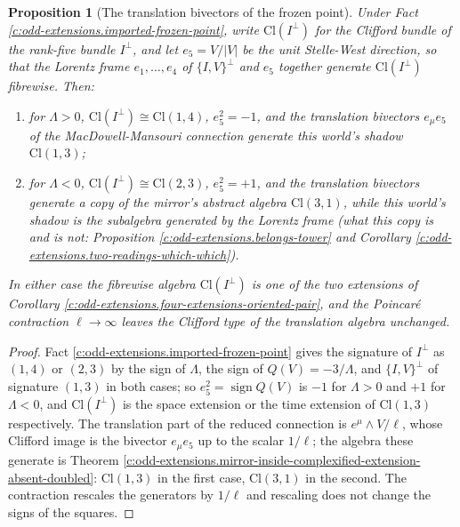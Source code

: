 \documentclass[11pt]{article}
\newtheorem{proposition}[theorem]{Proposition}
\theoremstyle{definition}
\theoremstyle{plain}
\newcommand{\changedmark}[2]{\marginpar{\raggedright\scriptsize\color{#1}#2}}
\providecommand{\Cl}{}\renewcommand{\Cl}{\mathrm{Cl}}
\begin{document}
\begin{proposition}[The translation bivectors of the frozen point]\label{c:odd-extensions.translation-bivectors-frozen-point}
\changedmark{gray}{reworded}
Under Fact \ref{c:odd-extensions.imported-frozen-point}, write $\Cl(I^{\perp})$ for the Clifford bundle of the rank-five bundle $I^{\perp}$, and let $e_{5} = V/|V|$ be the unit Stelle-West direction, so that the Lorentz frame $e_{1}, \ldots, e_{4}$ of $\{I,V\}^{\perp}$ and $e_{5}$ together generate $\Cl(I^{\perp})$ fibrewise. Then:
\begin{enumerate}
\item[(i)] for $\Lambda > 0$, $\Cl(I^{\perp}) \cong \Cl(1,4)$, $e_{5}^{2} = -1$, and the translation bivectors $e_{\mu}e_{5}$ of the MacDowell-Mansouri connection generate this world's shadow $\Cl(1,3)$;
\item[(ii)] for $\Lambda < 0$, $\Cl(I^{\perp}) \cong \Cl(2,3)$, $e_{5}^{2} = +1$, and the translation bivectors generate a copy of the mirror's abstract algebra $\Cl(3,1)$, while this world's shadow is the subalgebra generated by the Lorentz frame (what this copy is and is not: Proposition \ref{c:odd-extensions.belongs-tower} and Corollary \ref{c:odd-extensions.two-readings-which-which}).
\end{enumerate}
In either case the fibrewise algebra $\Cl(I^{\perp})$ is one of the two extensions of Corollary \ref{c:odd-extensions.four-extensions-oriented-pair}, and the Poincar\'e contraction $\ell \to \infty$ leaves the Clifford type of the translation algebra unchanged.
\end{proposition}
\begin{proof}
Fact \ref{c:odd-extensions.imported-frozen-point} gives the signature of $I^{\perp}$ as $(1,4)$ or $(2,3)$ by the sign of $\Lambda$, the sign of $Q(V) = -3/\Lambda$, and $\{I,V\}^{\perp}$ of signature $(1,3)$ in both cases; so $e_{5}^{2} = \operatorname{sign}Q(V)$ is $-1$ for $\Lambda > 0$ and $+1$ for $\Lambda < 0$, and $\Cl(I^{\perp})$ is the space extension or the time extension of $\Cl(1,3)$ respectively. The translation part of the reduced connection is $e^{\mu}\wedge V/\ell$, whose Clifford image is the bivector $e_{\mu}e_{5}$ up to the scalar $1/\ell$; the algebra these generate is Theorem \ref{c:odd-extensions.mirror-inside-complexified-extension-absent-doubled}: $\Cl(1,3)$ in the first case, $\Cl(3,1)$ in the second. The contraction rescales the generators by $1/\ell$ and rescaling does not change the signs of the squares.

\end{proof}
\end{document}
